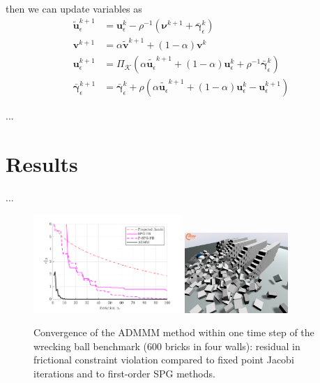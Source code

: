 \documentclass{svproc}
\newcommand{\vect}[1]{\bm{#1}}
\begin{document}
then we can update variables as
\begin{subequations}
	\begin{align}
	\tilde{\vect{u}}_\epsilon^{k+1} &= \vect{u}_\epsilon^k - \rho^{-1}(\vect{\nu}^{k+1} + \bar{\vect{\gamma}}_\epsilon^k)\\
	\vect{v}^{k+1} &= \alpha \tilde{\vect{v}}^{k+1} + (1-\alpha) \vect{v}^k\\
	\vect{u}_\epsilon^{k+1} &= \Pi_\mathcal{K}( \alpha \tilde{\vect{u}_\epsilon}^{k+1} + (1-\alpha) \vect{u}_\epsilon^k + \rho^{-1} \bar{\vect{\gamma}}_\epsilon^k ) \\
	\bar{\vect{\gamma}}_\epsilon^{k+1} &= \bar{\vect{\gamma}}_\epsilon^k + \rho (  \alpha \tilde{\vect{u}_\epsilon}^{k+1} + (1-\alpha) \vect{u}_\epsilon^k - \vect{u}_\epsilon^{k+1} )
	\end{align}
\end{subequations}

...





\section{Results}

...

\begin{figure}[h!]
\centering
\includegraphics[width=0.50\textwidth]{t8_convergence.pdf}
\includegraphics[width=0.35\textwidth, trim=0cm -3cm 0 3cm]{t8_snapshot.png}
\caption{Convergence of the ADMMM method within one time step of the wrecking ball benchmark (600 bricks in four walls): residual in frictional constraint   violation compared to fixed point Jacobi iterations and to first-order SPG methods.}
\end{figure}
\end{document}
